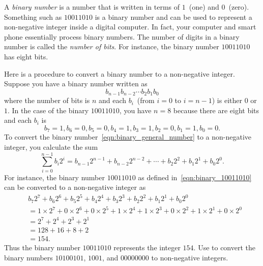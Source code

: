 \documentclass[a4paper,oneside,12pt]{article}
\begin{document}
\begin{problem}
{\begin{solution}
\end{solution}
}{}

\item A \emph{binary number} is a number that is written in terms of
  $1$~(one) and $0$~(zero).  Something such as $10011010$ is a binary
  number and can be used to represent a non-negative integer inside a
  digital computer.  In fact, your computer and smart phone
  essentially process binary numbers.  The number of digits in a
  binary number is called the \emph{number of bits}.  For instance,
  the binary number $10011010$ has eight bits.
  \begin{packedenum}
  \item\label{subprob:binary_to_decimal}
    Here is a procedure to convert a binary number to a non-negative
    integer.  Suppose you have a binary number written as
    \begin{equation}
    \label{eqn:binary_general_number}
    b_{n-1} b_{n-2} \cdots b_2 b_1 b_0
    \end{equation}
    where the number of bits is $n$ and each $b_i$~(from $i = 0$ to
    $i = n - 1$) is either $0$ or $1$.  In the case of the binary
    $10011010$, you have $n = 8$ because there are eight bits and each
    $b_i$ is
    \begin{equation}
    \label{eqn:binary_10011010}
    b_7 = 1\comma
    b_6 = 0\comma
    b_5 = 0\comma
    b_4 = 1\comma
    b_3 = 1\comma
    b_2 = 0\comma
    b_1 = 1\comma
    b_0 = 0.
    \end{equation}
    To convert the binary number~\eqref{eqn:binary_general_number} to
    a non-negative integer, you calculate the sum
    \begin{equation}
    \label{eqn:binary_to_decimal_formula}
    \sum_{i=0}^{n-1} b_i 2^i
    =
    b_{n-1} 2^{n-1} + b_{n-2} 2^{n-2} + \cdots
    + b_2 2^2 + b_1 2^1 + b_0 2^0.
    \end{equation}
    For instance, the binary number $10011010$ as defined
    in~\eqref{eqn:binary_10011010} can be converted to a non-negative
    integer as
    \begin{align*}
    &b_7 2^7 + b_6 2^6 + b_5 2^5 + b_4 2^4
      + b_3 2^3 + b_2 2^2 + b_1 2^1 + b_0 2^0 \\[4pt]
    &=
    1 \times 2^7 + 0 \times 2^6 + 0 \times 2^5 + 1 \times 2^4
    + 1 \times 2^3 + 0 \times 2^2 + 1 \times 2^1 + 0 \times 2^0 \\[4pt]
    &=
    2^7 + 2^4 + 2^3 + 2^1 \\[4pt]
    &=
    128 + 16 + 8 + 2 \\[4pt]
    &=
    154.
    \end{align*}
    Thus the binary number $10011010$ represents the integer $154$.
    Use  to convert the binary
    numbers $10100101$, $1001$, and $00000000$ to non-negative
    integers.


\end{packedenum}
\end{problem}
\end{document}
